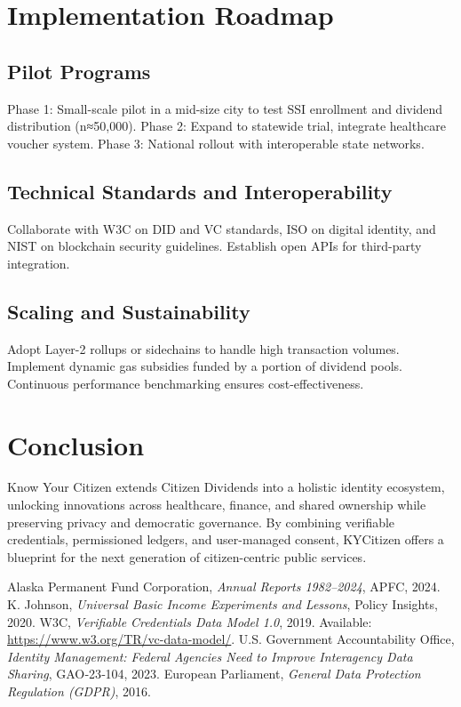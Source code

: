 \documentclass[11pt]{article}
\begin{document}
\section{Implementation Roadmap}
\subsection{Pilot Programs}
Phase 1: Small-scale pilot in a mid-size city to test SSI enrollment and dividend distribution (n≈50,000).  
Phase 2: Expand to statewide trial, integrate healthcare voucher system.  
Phase 3: National rollout with interoperable state networks.

\subsection{Technical Standards and Interoperability}
Collaborate with W3C on DID and VC standards, ISO on digital identity, and NIST on blockchain security guidelines. Establish open APIs for third-party integration.

\subsection{Scaling and Sustainability}
Adopt Layer-2 rollups or sidechains to handle high transaction volumes. Implement dynamic gas subsidies funded by a portion of dividend pools. Continuous performance benchmarking ensures cost-effectiveness.

\section{Conclusion}
Know Your Citizen extends Citizen Dividends into a holistic identity ecosystem, unlocking innovations across healthcare, finance, and shared ownership while preserving privacy and democratic governance. By combining verifiable credentials, permissioned ledgers, and user-managed consent, KYCitizen offers a blueprint for the next generation of citizen-centric public services.

\newpage

\begin{thebibliography}{99}
 Alaska Permanent Fund Corporation, \emph{Annual Reports 1982--2024}, APFC, 2024.
 K. Johnson, \emph{Universal Basic Income Experiments and Lessons}, Policy Insights, 2020.
 W3C, \emph{Verifiable Credentials Data Model 1.0}, 2019. Available: \url{https://www.w3.org/TR/vc-data-model/}.
 U.S. Government Accountability Office, \emph{Identity Management: Federal Agencies Need to Improve Interagency Data Sharing}, GAO‑23‑104, 2023.
 European Parliament, \emph{General Data Protection Regulation (GDPR)}, 2016.
\end{thebibliography}
\end{document}
